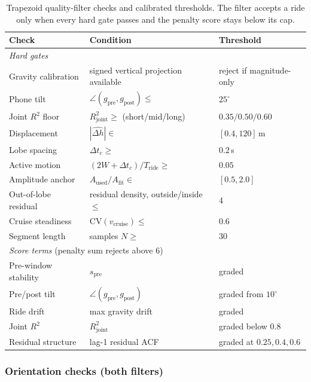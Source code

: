 \documentclass[manuscript,review,screen]{acmart}
\begin{document}
\begin{table}[ht]
\centering
\small
\begin{tabular}{lll}
\toprule
\textbf{Check} & \textbf{Condition} & \textbf{Threshold} \\
\midrule
\multicolumn{3}{l}{\emph{Hard gates}}\\
Gravity calibration  & signed vertical projection available & reject if magnitude-only \\
Phone tilt           & $\angle(g_{\mathrm{pre}},g_{\mathrm{post}})\le$ & $25^{\circ}$ \\
Joint $R^{2}$ floor  & $R^{2}_{\mathrm{joint}}\ge$ (short/mid/long) & $0.35/0.50/0.60$ \\
Displacement         & $|\widehat{\Delta h}|\in$ & $[0.4,120]$\,m \\
Lobe spacing         & $\Delta t_c\ge$ & $0.2$\,s \\
Active motion        & $(2W{+}\Delta t_c)/T_{\text{ride}}\ge$ & $0.05$ \\
Amplitude anchor     & $A_{\mathrm{used}}/A_{\mathrm{fit}}\in$ & $[0.5,2.0]$ \\
Out-of-lobe residual & residual density, outside/inside $\le$ & $4$ \\
Cruise steadiness    & $\mathrm{CV}(v_{\mathrm{cruise}})\le$ & $0.6$ \\
Segment length       & samples $N\ge$ & $30$ \\
\midrule
\multicolumn{3}{l}{\emph{Score terms} (penalty sum rejects above $6$)}\\
Pre-window stability & $s_{\mathrm{pre}}$ & graded \\
Pre/post tilt        & $\angle(g_{\mathrm{pre}},g_{\mathrm{post}})$ & graded from $10^{\circ}$ \\
Ride drift           & max gravity drift & graded \\
Joint $R^{2}$        & $R^{2}_{\mathrm{joint}}$ & graded below $0.8$ \\
Residual structure   & lag-1 residual ACF & graded at $0.25,0.4,0.6$ \\
\bottomrule
\end{tabular}
\caption{Trapezoid quality-filter checks and calibrated thresholds.
  The filter accepts a ride only when every hard gate passes and the
  penalty score stays below its cap.}
\label{tab:quality-checks}
\end{table}

\subsubsection*{Orientation checks (both filters)}
\end{document}
